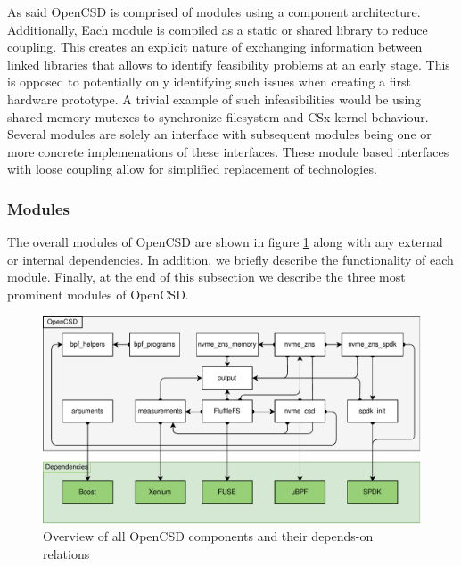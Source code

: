 
As said OpenCSD is comprised of modules using a component architecture.
Additionally, Each module is compiled as a static or shared library to reduce
coupling. This creates an explicit nature of exchanging information between
linked libraries that allows to identify feasibility problems at an early stage.
This is opposed to potentially only identifying such issues when creating a
first hardware prototype. A trivial example of such infeasibilities would be
using shared memory mutexes to synchronize filesystem and CSx kernel behaviour.
Several modules are solely an interface with subsequent modules being one or
more concrete implemenations of these interfaces. These module based interfaces
with loose coupling allow for simplified replacement of technologies.

\subsubsection{Modules}

The overall modules of OpenCSD are shown in figure
\ref{figure:moduledependencies} along with any external or internal
dependencies. In addition, we briefly describe the functionality of each module.
Finally, at the end of this subsection we describe the three most prominent
modules of OpenCSD.


\begin{figure}
    \centering
	\includegraphics[width=1\textwidth]{resources/images/module-dependencies.pdf}
	\caption{Overview of all OpenCSD components and their depends-on relations}
    \label{figure:moduledependencies}
\end{figure}


